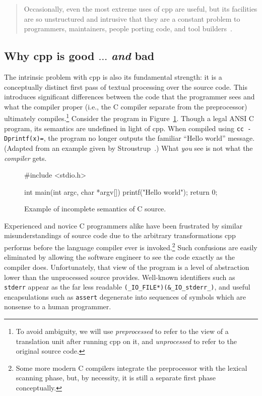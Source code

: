 \documentclass{article}
\newcommand{\Cpp}{\mbox{\textsf{cpp}}}
\newcommand{\C}{\mbox{C}}
\newcommand{\ie}{i.e.,}
\newcommand{\figref}[1]{Figure~\ref{#1}}
\begin{document}
\begin{quotation}
\noindent Occasionally, even the most extreme uses of \Cpp{} are useful, but its
facilities are so unstructured and intrusive that they are a constant
problem to programmers, maintainers, people porting code, and tool
builders~\cite[p.~424]{Stroustrup94}.
\end{quotation}

\subsection{Why \Cpp{} is good $\ldots$ \emph{and} bad}

The intrinsic problem with \Cpp{} is also its fundamental strength: it
is a conceptually distinct first pass of textual processing over the
source code.  This introduces significant differences between the code that the
programmer sees and what the compiler proper (\ie{} the \C{} compiler
separate from the preprocessor) ultimately compiles.\footnote{To avoid
  ambiguity, we will use \emph{preprocessed} to refer to the view of a
  translation unit after running \Cpp{} on it, and \emph{unprocessed} to
  refer to the original source code.} Consider the program in
\figref{fig:badmain}.  Though a legal ANSI \C{} program, its semantics are
undefined in light of \Cpp{}.  When compiled using \texttt{cc
  -Dprintf(x)=}, the program no longer outputs the familiar ``Hello
world'' message. (Adapted from an example given by
  Stroustrup~\cite[p.~423]{Stroustrup94}.)  What \emph{you} see is not
what the \emph{compiler} gets.

\begin{figure}[hbtp]
\begin{center}
\begin{small}
\begin{pseudocode}[3in]
#include <stdio.h>

int main(int argc, char *argv[]) {
  printf("Hello world\n");
  return 0;
}
\end{pseudocode}
\end{small}
\caption{Example of incomplete semantics of \C{} source.}
\label{fig:badmain}
\end{center}
\end{figure}

Experienced and novice \C{} programmers alike have been frustrated by
similar misunderstandings of source code due to the arbitrary
transformations \Cpp{} performs before the language compiler ever is
invoked.\footnote{Some more modern \C{} compilers integrate the
  preprocessor with the lexical scanning phase, but, by necessity, it is
  still a separate first phase conceptually.}  Such confusions are
easily eliminated by allowing the software engineer to see the code
exactly as the compiler does.  Unfortunately, that view of the program
is a level of abstraction lower than the unprocessed source provides.
Well-known identifiers such as \texttt{stderr} appear as the far less
readable \texttt{(\_IO\_FILE*)(\&\_IO\_stderr\_)},
and useful encapsulations such as \texttt{assert} degenerate into
sequences of symbols which are nonsense to a human programmer.
\end{document}
